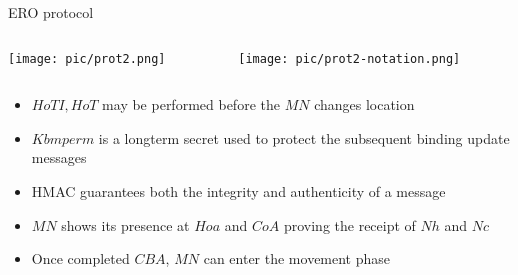 \documentclass[10pt]{beamer}
\begin{document}
\iffalse
\begin{frame}{ERO protocol}
	\small
	\begin{center} 
		\texttt{[image: pic/prot2.png]}
		\vspace*{30.0cm}
		\texttt{[image: pic/prot2-notation.png]}
	\end{center}
\end{frame}
\fi
\begin{frame}{ERO protocol}
	\small
	\begin{columns}[T]
		\begin{column}{0.6\textwidth}
			\texttt{[image: pic/prot2.png]}
		\end{column}
		\begin{column}{0.58\textwidth}
			\begin{center}
				\texttt{[image: pic/prot2-notation.png]}
			\end{center}
		\end{column}
	\end{columns}
	\vspace{0.2cm}
	\begin{itemize}
		\item $HoTI, HoT$ may be performed before the $MN$ changes location
		\item $Kbmperm$ is a longterm secret used to protect the subsequent binding update messages
		\item HMAC guarantees both the integrity and authenticity of a message
		\item $MN$ shows its presence at $Hoa$ and $CoA$ proving the receipt of $Nh$ and $Nc$
		\item Once completed $CBA$, $MN$ can enter the movement phase
	\end{itemize}
\end{frame}
\end{document}
